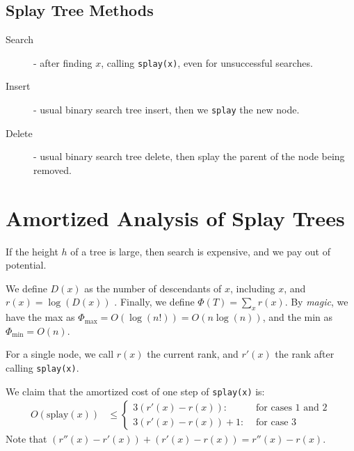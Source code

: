                 \subsection{Splay Tree Methods} %
                \label{sub:splay_tree_methods}
                    \begin{description}
                        \item[Search] - after finding $x$, calling \verb|splay(x)|, even for unsuccessful searches.
                        \item[Insert] - usual binary search tree insert, then we \verb|splay| the new node.
                        \item[Delete] - usual binary search tree delete, then splay the parent of the node being removed.
                    \end{description}
            \section{Amortized Analysis of Splay Trees} %
            \label{sec:amortized_analysis_of_splay_trees}
                If the height $h$ of a tree is large, then search is expensive, and we pay out of potential.

                We define $D(x)$ as the number of descendants of $x$, including $x$, and $r(x) = \log(D(x))$ .
                Finally, we define $\Phi(T) = \sum_x r(x)$.
                By \textit{magic}, we have the max as $\Phi_{\text{max}} = O(\log(n!)) = O(n\log(n))$, and the min as $\Phi_\text{min} = O(n)$.

                For a single node, we call $r(x)$ the current rank, and $r'(x)$ the rank after calling \verb|splay(x)|.

                We claim that the amortized cost of one step of \verb|splay(x)| is:
                \begin{align*}
                    O(\text{splay}(x)) &\le
                    \left\{
                        \begin{array}{lr}
                            3 (r'(x) - r(x)) :& \text{ for cases 1 and 2}\\
                            3 (r'(x) - r(x)) + 1 :& \text{ for case 3}
                        \end{array}
                    \right.
                \end{align*}
                Note that $(r''(x) - r'(x)) + (r'(x) - r(x)) = r''(x) - r(x)$.

